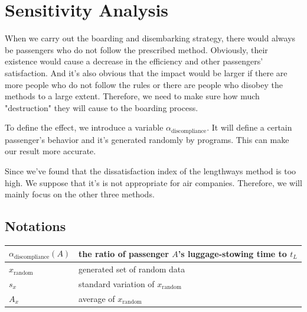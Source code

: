 \documentclass{article}
\theoremstyle{definition}
\theoremstyle{remark}
\numberwithin{equation}{section}
\begin{document}
	\section{Sensitivity Analysis}
	When we carry out the boarding and disembarking strategy, there would always be passengers who do not follow the prescribed method. Obviously, their existence would cause a decrease in the efficiency and other passengers' satisfaction. And it's also obvious that the impact would be larger if there are more people who do not follow the rules or there are people who disobey the methods to a large extent. Therefore, we need to make sure how much "destruction" they will cause to the boarding process.

	To define the effect, we introduce a variable $\alpha_\text{discompliance}$. It will define a certain passenger's behavior and it's generated randomly by programs. This can make our result more accurate.

	Since we've found that the dissatisfaction index of the lengthways method is too high. We suppose that it's is not appropriate for air companies. Therefore, we will mainly focus on the other three methods.
	\subsection{Notations}
	\begin{center}
	\begin{tabular}{|l|l|}
		\hline
			$\alpha_\text{discompliance}(A)$ & the ratio of passenger \(A\)'s luggage-stowing time to \(t_L\) \\
		\hline
			\(x_{\mathrm{random}}\) & generated set of random data \\
		\hline
			\(s_x\) & standard variation of \(x_{\mathrm{random}}\) \\
		\hline
			\(A_x\) & average of \(x_{\mathrm{random}}\) \\
		\hline
	\end{tabular}
	\end{center}
\end{document}
